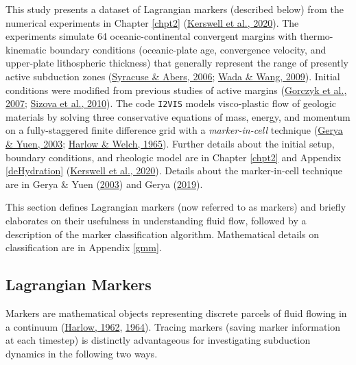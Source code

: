 This study presents a dataset of Lagrangian markers (described below) from the numerical experiments in Chapter \ref{chpt2} (\protect\hyperlink{ref-kerswell2020}{Kerswell et al., 2020}). The experiments simulate 64 oceanic-continental convergent margins with thermo-kinematic boundary conditions (oceanic-plate age, convergence velocity, and upper-plate lithospheric thickness) that generally represent the range of presently active subduction zones (\protect\hyperlink{ref-syracuse2006}{Syracuse \& Abers, 2006}; \protect\hyperlink{ref-wada2009}{Wada \& Wang, 2009}). Initial conditions were modified from previous studies of active margins (\protect\hyperlink{ref-gorczyk2007}{Gorczyk et al., 2007}; \protect\hyperlink{ref-sizova2010}{Sizova et al., 2010}). The code \texttt{I2VIS} models visco-plastic flow of geologic materials by solving three conservative equations of mass, energy, and momentum on a fully-staggered finite difference grid with a \emph{marker-in-cell} technique (\protect\hyperlink{ref-gerya2003}{Gerya \& Yuen, 2003}; \protect\hyperlink{ref-harlow1965}{Harlow \& Welch, 1965}). Further details about the initial setup, boundary conditions, and rheologic model are in Chapter \ref{chpt2} and Appendix \ref{deHydration} (\protect\hyperlink{ref-kerswell2020}{Kerswell et al., 2020}). Details about the marker-in-cell technique are in Gerya \& Yuen (\protect\hyperlink{ref-gerya2003}{2003}) and Gerya (\protect\hyperlink{ref-gerya2019}{2019}).

This section defines Lagrangian markers (now referred to as markers) and briefly elaborates on their usefulness in understanding fluid flow, followed by a description of the marker classification algorithm. Mathematical details on classification are in Appendix \ref{gmm}.

\hypertarget{lagrangian-markers}{%
\subsection{Lagrangian Markers}\label{lagrangian-markers}}

Markers are mathematical objects representing discrete parcels of fluid flowing in a continuum (\protect\hyperlink{ref-harlow1962}{Harlow, 1962}, \protect\hyperlink{ref-harlow1964}{1964}). Tracing markers (saving marker information at each timestep) is distinctly advantageous for investigating subduction dynamics in the following two ways.

